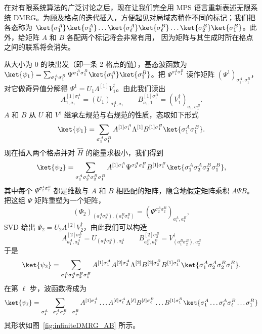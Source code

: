在对有限系统算法的广泛讨论之后，现在让我们完全用 MPS 语言重新表述无限系统 DMRG。为顾及格点的迭代插入，方便起见对局域态稍作不同的标记；我们把各态称为 $\ket{\sigma_1^A} \ket{\sigma_2^A} \ldots \ket{\sigma_\ell^A}\ket{\sigma_\ell^B} \ldots \ket{\sigma_2^B}\ket{\sigma_1^B}$。此外，给矩阵 $A$ 和 $B$ 各配两个标记将会非常有用，
因为矩阵与其生成时所在格点之间的联系将会消失。

从大小为 0 的块出发（即一条 2 格点的链），基态波函数为 $\ket{\psi_1}=\sum_{\sigma_1^A \sigma_1^B} \Psi^{\sigma_1^A \sigma_1^B} \ket{\sigma_1^A} \ket{\sigma_1^B}$。把 $\Psi^{\sigma_1^A\sigma_1^B}$ 读作矩阵 $(\Psi^1)_{\sigma_1^A,\sigma_1^B}$，对它做奇异值分解得  $\Psi^1=U_1 \Lambda^{[1]} V^\dagger_1$。由此我们读出
\begin{equation}
A^{[1]\sigma_1^A}_{1,a_1} = (U_1)_{\sigma_1^A,a_1} \quad\quad B^{[1]\sigma_1^B}_{a_1,1} = (V^\dagger_1)_{a_1,\sigma_1^B} .
\end{equation} 
$A$ 和 $B$ 从 $U$ 和 $V^\dagger$ 继承左规范与右规范的性质，态取如下形式
\begin{equation}
\ket{\psi_1} = \sum_{\sigma_1^A \sigma_1^B} A^{[1]\sigma_1^A} \Lambda^{[1]} B^{[1]\sigma_1^B} \ket{\sigma_1^A \sigma_1^B} .
\end{equation}
现在插入两个格点并对 $\hat{H}$ 的能量求极小，我们得到
\begin{equation}
\ket{\psi_2} = \sum_{\sigma_1^A \sigma_2^A \sigma_2^B \sigma_1^B} A^{[1]\sigma_1^A} 
\Psi^{\sigma_2^A \sigma_2^B} 
B^{[1]\sigma_1^B} \ket{\sigma_1^A \sigma_2^A \sigma_2^B \sigma_1^B},
\end{equation}
其中每个 $\Psi^{\sigma_2^A \sigma_2^B}$ 都是维数与 $A$ 和 $B$ 相匹配的矩阵，隐含地假定矩阵乘积 $A\Psi B$。把这组 $\Psi$ 矩阵重塑为一个矩阵，
\begin{equation}
(\Psi_2)_{(a_1^A \sigma_2^A),(a_1^B \sigma_2^B)} =  (\Psi^{\sigma_2^A \sigma_2^B})_{a_1^A,a_1^B},
\end{equation}
SVD 给出 $\Psi_2 = U_2 \Lambda^{[2]} V^\dagger_2$，由此我们可以构造
\begin{equation}
A^{[2]\sigma_2^A}_{a_1^A,a_2^A} = U_{(a_1^A \sigma_2^A), a_2^A} \quad\quad  
B^{[2]\sigma_2^B}_{a_2^B,a_1^B} = V^\dagger_{(a_1^B \sigma_2^B), a_2^B}
\end{equation}
于是
\begin{equation}
\ket{\psi_2} = \sum_{\sigma_1^A \sigma_2^A \sigma_2^B \sigma_1^B} 
A^{[1]\sigma_1^A}A^{[2]\sigma_2^A} \Lambda^{[2]} B^{[2]\sigma_2^B}B^{[1]\sigma_1^B} 
\ket{\sigma_1^A \sigma_2^A \sigma_2^B \sigma_1^B}.
\end{equation}
在第 $\ell$ 步，波函数将成为
\begin{equation}
\ket{\psi_\ell} = \sum_{\sigma_1^A \ldots \sigma_\ell^A \sigma_\ell^B \ldots \sigma_1^B} 
A^{[1]\sigma_1^A} \ldots A^{[\ell]\sigma_\ell^A} \Lambda^{[\ell]} B^{[\ell]\sigma_\ell^B} \ldots B^{[1]\sigma_1^B}  
\ket{\sigma_1^A \ldots \sigma_\ell^A \sigma_\ell^B \ldots \sigma_1^B}
\end{equation}
其形状如图~\ref{fig:infiniteDMRG_AB} 所示。

